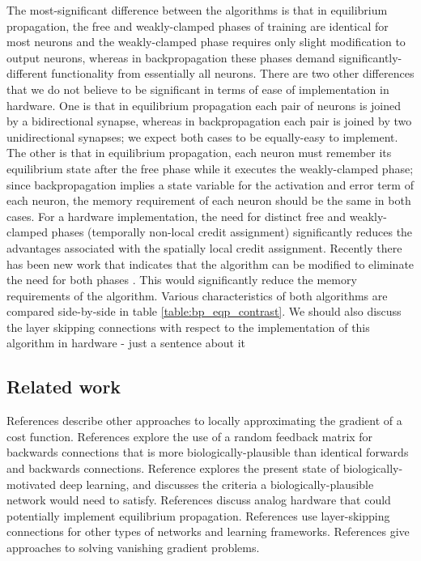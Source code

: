 \documentclass[utf8]{frontiersSCNS}
\begin{document}
The most-significant difference between the algorithms is that in equilibrium propagation, the free
and weakly-clamped phases of training are identical for most neurons and the weakly-clamped phase 
requires only slight modification to output neurons, whereas in backpropagation these phases demand significantly-different functionality from essentially all neurons. There are two other differences that we do not believe to be significant in terms of ease of implementation in hardware. One is that in equilibrium propagation each pair of neurons is joined by a bidirectional synapse, whereas in backpropagation each pair is joined by two unidirectional synapses; we expect both cases to be equally-easy to implement. The other is that in equilibrium propagation, each neuron must remember its equilibrium state after the free phase while it executes the weakly-clamped phase; since backpropagation implies a state variable for the activation and error term of each neuron, the memory requirement of each neuron should be the same in both cases.
For a hardware implementation, the need for distinct free and weakly-clamped phases 
(temporally non-local credit assignment) significantly reduces the advantages associated with the 
spatially local credit assignment. Recently there has been new work that indicates that the 
algorithm can be modified to eliminate the need for both phases \citep{ernoult2020}. 
This would significantly reduce the memory requirements of the algorithm. Various characteristics 
of both algorithms are compared side-by-side in table \ref{table:bp_eqp_contrast}. {\color{blue} We
should also discuss the layer skipping connections with respect to the implementation of this 
algorithm in hardware - just a sentence about it}

\subsection{Related work}

References \citep{lee2015, xie2003, pineda1987} describe other approaches to locally approximating the gradient of a cost function. References \citep{lillicrap2014, crafton2019} explore the use of a random feedback matrix for backwards connections that is more biologically-plausible than identical forwards and backwards connections. Reference \citep{bartunov2018} explores the present state of biologically-motivated deep learning, and \citep{bengio2015} discusses the criteria a biologically-plausible network would need to satisfy. References \citep{shainline2019, davies2018, nahmias2013} discuss analog hardware that could potentially implement equilibrium propagation. References \citep{he2015, srivastava2015, xiaohu2011, krishnan2019} use layer-skipping connections for other types of networks and learning frameworks. References \citep{ioffe2015, glorot2010} give approaches to solving vanishing gradient problems.
\end{document}
